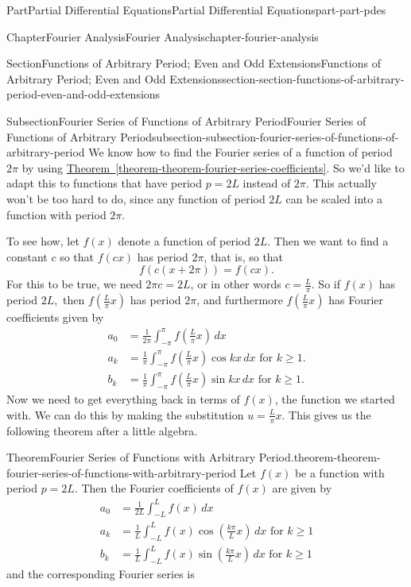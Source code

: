 \documentclass[twoside,10pt,]{book}
\newcommand{\xreffont}{\relax}
\numberwithin{equation}{part}
\newcommand{\amp}{&}
\begin{document}
\begin{partptx}{Part}{Partial Differential Equations}{}{Partial Differential Equations}{}{}{part-part-pdes}
\begin{chapterptx}{Chapter}{Fourier Analysis}{}{Fourier Analysis}{}{}{chapter-fourier-analysis}
\begin{sectionptx}{Section}{Functions of Arbitrary Period; Even and Odd Extensions}{}{Functions of Arbitrary Period; Even and Odd Extensions}{}{}{section-section-functions-of-arbitrary-period-even-and-odd-extensions}
\begin{subsectionptx}{Subsection}{Fourier Series of Functions of Arbitrary Period}{}{Fourier Series of Functions of Arbitrary Period}{}{}{subsection-subsection-fourier-series-of-functions-of-arbitrary-period}
We know how to find the Fourier series of a function of period \(2\pi\) by using \hyperref[theorem-theorem-fourier-series-coefficients]{Theorem~{\xreffont\ref{theorem-theorem-fourier-series-coefficients}}}. So we'd like to adapt this to functions that have period \(p = 2L\) instead of \(2\pi\). This actually won't be too hard to do, since any function of period \(2L\) can be scaled into a function with period \(2\pi\).%
\par
To see how, let \(f(x)\) denote a function of period \(2L\). Then we want to find a constant \(c\) so that \(f(cx)\) has period \(2\pi\), that is, so that%
\begin{equation*}
f(c(x+2\pi)) = f(cx).
\end{equation*}
For this to be true, we need \(2\pi c = 2L\), or in other words \(c = \frac{L}{\pi}\). So if \(f(x)\) has period \(2L,\) then \(f(\frac{L}{\pi}x)\) has period \(2\pi\), and furthermore \(f(\frac{L}{\pi}x)\) has Fourier coefficients given by%
\begin{align*}
a_{0} \amp= \frac{1}{2\pi}\int_{-\pi}^{\pi}f\left(\frac{L}{\pi}x\right)\,dx\\
a_{k} \amp= \frac{1}{\pi}\int_{-\pi}^{\pi}f\left(\frac{L}{\pi}x\right)\cos kx\,dx\text{ for $k\geq1$.}\\
b_{k} \amp= \frac{1}{\pi}\int_{-\pi}^{\pi}f\left(\frac{L}{\pi}x\right)\sin kx\,dx\text{ for $k\geq1$.}
\end{align*}
Now we need to get everything back in terms of \(f(x)\), the function we started with. We can do this by making the substitution \(u = \frac{L}{\pi}x\). This gives us the following theorem after a little algebra.%
\begin{theorem}{Theorem}{Fourier Series of Functions with Arbitrary Period.}{}{theorem-theorem-fourier-series-of-functions-with-arbitrary-period}%
%
Let \(f(x)\) be a function with period \(p = 2L\). Then the Fourier coefficients of \(f(x)\) are given by%
\begin{align*}
a_{0} \amp= \frac{1}{2L}\int_{-L}^{L}f\left(x\right)\,dx\\
a_{k} \amp= \frac{1}{L}\int_{-L}^{L}f\left(x\right)\cos\left(\frac{k\pi}{L}x\right)\,dx\text{ for $k\geq1$}\\
b_{k} \amp= \frac{1}{L}\int_{-L}^{L}f\left(x\right)\sin\left(\frac{k\pi}{L}x\right)\,dx\text{ for $k\geq1$}
\end{align*}
and the corresponding Fourier series is%
\begin{equation*}

\end{equation*}
\end{theorem}
\end{subsectionptx}
\end{sectionptx}
\end{chapterptx}
\end{partptx}
\end{document}

